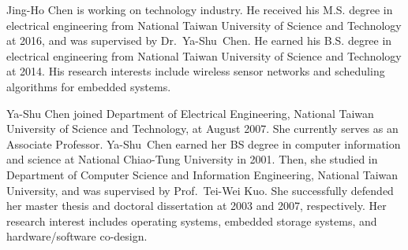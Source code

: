 \documentclass[10pt,journal,compsoc]{IEEEtran}
\begin{document}

%




\begin{IEEEbiography}{Jing-Ho Chen}
is working on technology industry. He received his M.S. degree in electrical engineering
from National Taiwan University of Science and Technology at 2016, and was supervised by Dr.~Ya-Shu~Chen. He earned his B.S. degree in electrical engineering from National Taiwan University of Science and Technology at 2014. His research interests include wireless sensor networks and scheduling algorithms for embedded systems.
\end{IEEEbiography}

\begin{IEEEbiography}{Ya-Shu Chen} joined Department of Electrical Engineering, National
Taiwan University of Science and Technology, at August 2007. She currently serves as an Associate Professor. Ya-Shu~Chen earned her BS degree in computer information and science at National
Chiao-Tung University in 2001. Then, she studied in Department of Computer Science and Information Engineering, National Taiwan University, and was supervised by Prof.~Tei-Wei Kuo. She successfully defended her master thesis and doctoral dissertation at 2003 and 2007, respectively. Her research interest includes operating systems, embedded storage systems, and hardware/software co-design.
\end{IEEEbiography}
\end{document}
